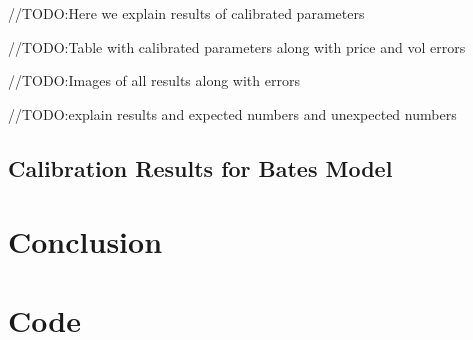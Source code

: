 \documentclass{article}
\begin{document}
//TODO:Here we explain results of calibrated parameters

//TODO:Table with calibrated parameters along with price and vol errors

//TODO:Images of all results along with errors

//TODO:explain results and expected numbers and unexpected numbers

\subsection{Calibration Results for Bates Model}

\section{Conclusion}
\section{Code}




\citep{ref1}
\citep{ref2}
\citep{ref3}
\citep{ref4}
\citep{ref5}
\citep{ref6}
\citep{ref7}
\citep{ref8}
\citep{ref9}
\end{document}
